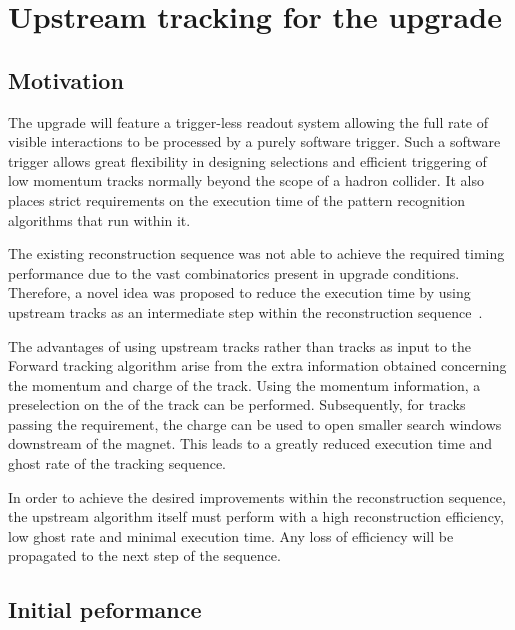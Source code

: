 \section{Upstream tracking for the \lhcb upgrade}
\label{sec:up-track-upgrade}


\subsection{Motivation}
\label{sec:up-track-upgrade:motivation}

The \lhcb upgrade will feature a trigger-less readout system allowing the full rate of visible interactions to be processed by a purely software trigger. Such a software trigger allows great flexibility in designing selections and efficient triggering of low momentum tracks normally beyond the scope of a hadron collider. It also places strict requirements on the execution time of the pattern recognition algorithms that run within it.

The existing reconstruction sequence was not able to achieve the required timing performance due to the vast combinatorics present in upgrade conditions. Therefore, a novel idea was proposed to reduce the execution time by using upstream tracks as an intermediate step within the reconstruction sequence~\cite{velout}.

The advantages of using upstream tracks rather than \velo tracks as input to the Forward tracking algorithm arise from the extra information obtained concerning the momentum and charge of the track. Using the momentum information, a preselection on the \pt of the track can be performed. Subsequently, for tracks passing the \pt requirement, the charge can be used to open smaller search windows downstream of the magnet. This leads to a greatly reduced execution time and ghost rate of the tracking sequence.

In order to achieve the desired improvements within the reconstruction sequence, the upstream algorithm itself must perform with a high reconstruction efficiency, low ghost rate and minimal execution time. Any loss of efficiency will be propagated to the next step of the sequence. 

\subsection{Initial peformance}

